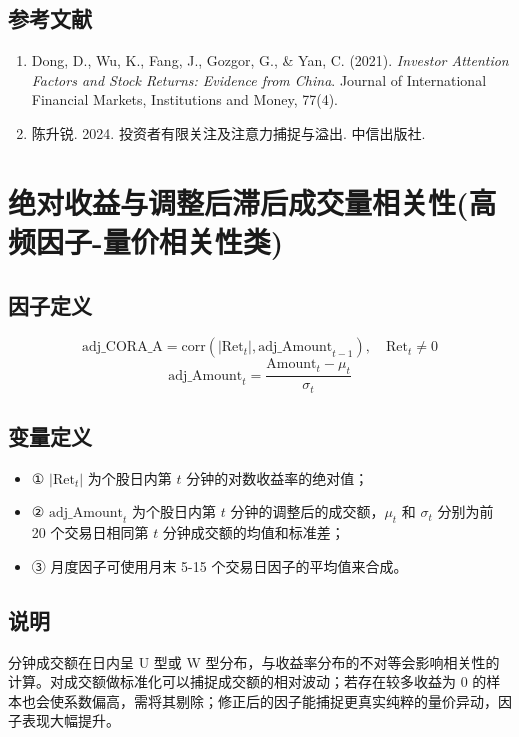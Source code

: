 \documentclass{article}
\begin{document}
\subsection{参考文献}
\begin{enumerate}
    \item Dong, D., Wu, K., Fang, J., Gozgor, G., \& Yan, C. (2021). \textit{Investor Attention Factors and Stock Returns: Evidence from China}. Journal of International Financial Markets, Institutions and Money, 77(4).
    \item 陈升锐. 2024. 投资者有限关注及注意力捕捉与溢出. 中信出版社.
\end{enumerate}

\section{绝对收益与调整后滞后成交量相关性(高频因子-量价相关性类)}

\subsection{因子定义}
\begin{equation}
    \mathrm{adj\_CORA\_A} = \mathrm{corr}(|\mathrm{Ret}_t|, \mathrm{adj\_Amount}_{t-1}), \quad \mathrm{Ret}_t \neq 0
\end{equation}
\begin{equation}
    \mathrm{adj\_Amount}_t = \frac{\mathrm{Amount}_t - \mu_t}{\sigma_t}
\end{equation}

\subsection{变量定义}
\begin{itemize}
    \item ① \( |\mathrm{Ret}_t| \) 为个股日内第 \( t \) 分钟的对数收益率的绝对值；
    \item ② \( \mathrm{adj\_Amount}_t \) 为个股日内第 \( t \) 分钟的调整后的成交额，\( \mu_t \) 和 \( \sigma_t \) 分别为前 20 个交易日相同第 \( t \) 分钟成交额的均值和标准差；
    \item ③ 月度因子可使用月末 5-15 个交易日因子的平均值来合成。
\end{itemize}

\subsection{说明}
分钟成交额在日内呈 U 型或 W 型分布，与收益率分布的不对等会影响相关性的计算。对成交额做标准化可以捕捉成交额的相对波动；若存在较多收益为 0 的样本也会使系数偏高，需将其剔除；修正后的因子能捕捉更真实纯粹的量价异动，因子表现大幅提升。
\end{document}
